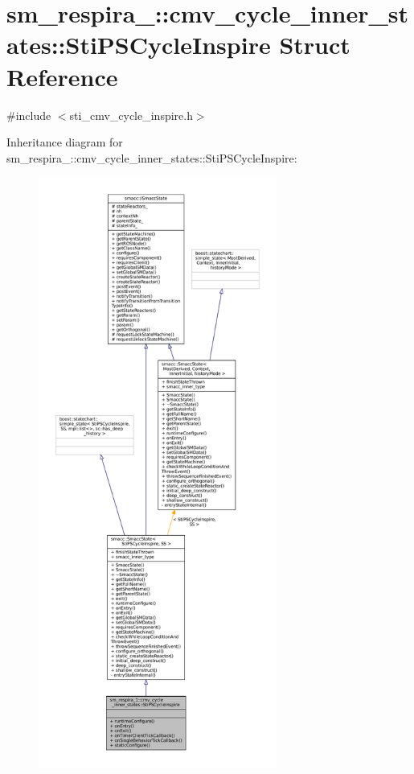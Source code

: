 \hypertarget{structsm__respira__1_1_1cmv__cycle__inner__states_1_1StiPSCycleInspire}{}\section{sm\+\_\+respira\+\_\+:\+:cmv\+\_\+cycle\+\_\+inner\+\_\+states\+:\+:Sti\+P\+S\+Cycle\+Inspire Struct Reference}
\label{structsm__respira__1_1_1cmv__cycle__inner__states_1_1StiPSCycleInspire}


{\ttfamily \#include $<$sti\+\_\+cmv\+\_\+cycle\+\_\+inspire.\+h$>$}



Inheritance diagram for sm\+\_\+respira\+\_\+:\+:cmv\+\_\+cycle\+\_\+inner\+\_\+states\+:\+:Sti\+P\+S\+Cycle\+Inspire\+:
\nopagebreak
\begin{figure}[H]
\begin{center}
\leavevmode
\includegraphics[height=550pt]{structsm__respira__1_1_1cmv__cycle__inner__states_1_1StiPSCycleInspire__inherit__graph}
\end{center}
\end{figure}


